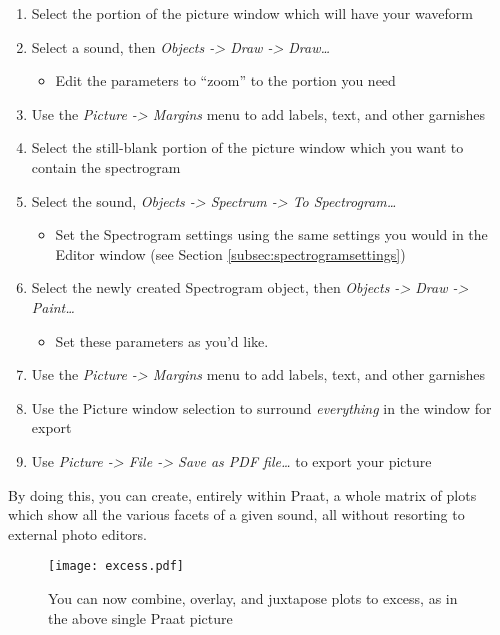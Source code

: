 \documentclass[11pt]{article}
\def\tightlist{}
\begin{document}
\begin{enumerate}
\def\labelenumi{\arabic{enumi}.}
\tightlist
\item
  Select the portion of the picture window which will have your waveform
\item
  Select a sound, then \emph{Objects -\textgreater{} Draw
  -\textgreater{} Draw\ldots{}}

  \begin{itemize}
  \tightlist
  \item
    Edit the parameters to ``zoom'' to the portion you need
  \end{itemize}
\item
  Use the \emph{Picture -\textgreater{} Margins} menu to add labels,
  text, and other garnishes
\item
  Select the still-blank portion of the picture window which you want to
  contain the spectrogram
\item
  Select the sound, \emph{Objects -\textgreater{} Spectrum
  -\textgreater{} To Spectrogram\ldots{}}

  \begin{itemize}
  \tightlist
  \item
    Set the Spectrogram settings using the same settings you would in
    the Editor window (see Section \ref{subsec:spectrogramsettings})
  \end{itemize}
\item
  Select the newly created Spectrogram object, then \emph{Objects
  -\textgreater{} Draw -\textgreater{} Paint\ldots{}}

  \begin{itemize}
  \tightlist
  \item
    Set these parameters as you'd like.
  \end{itemize}
\item
  Use the \emph{Picture -\textgreater{} Margins} menu to add labels,
  text, and other garnishes
\item
  Use the Picture window selection to surround \emph{everything} in the
  window for export
\item
  Use \emph{Picture -\textgreater{} File -\textgreater{} Save as PDF
  file\ldots{}} to export your picture
\end{enumerate}

By doing this, you can create, entirely within Praat, a whole matrix of
plots which show all the various facets of a given sound, all without
resorting to external photo editors.

\begin{figure}
  \centerline{
    \mbox{\texttt{[image: excess.pdf]}}
  }
  \caption{You can now combine, overlay, and juxtapose plots to excess, as in the above single Praat picture}
  
  \end{figure}
\end{document}
